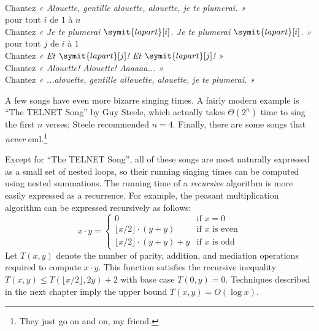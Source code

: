 \begin{pseudocode}
\\
Chantez {\sffamily\itshape « Alouette, gentille alouette, alouette, je te plumerai. »}\\
pour tout $i$ de $1$ à $n$\\
\Indent Chantez {\sffamily\itshape « Je te plumerai} $\symit{lapart}[i]${\sffamily\itshape . Je te plumerai} $\symit{lapart}[i]${\sffamily\itshape . »}\\
\Indent pour tout $j$ de $i$ à $1$ \\
\Indent\Indent Chantez {\sffamily\itshape « Et} $\symit{lapart}[j]${\sffamily\itshape ! Et} $\symit{lapart}[j]${\sffamily\itshape ! »}\\
\Indent Chantez {\sffamily\itshape « Alouette! Alouette! Aaaaaa... »}\\
\Indent Chantez {\sffamily\itshape « ...alouette, gentille allouette, alouette, je te plumerai. »}
\end{pseudocode}

A few songs have even more bizarre singing times. A fairly modern example is “The TELNET Song” by Guy Steele, which actually takes $\Theta(2^n)$ time to sing the first $n$ verses; Steele recommended $n = 4$. Finally, there are some songs that \textit{never} end.\footnote{They just go on and on, my friend.}

Except for “The TELNET Song”, all of these songs are most naturally expressed as a small set of nested loops, so their running singing times can be computed using nested summations. The running time of a \textit{recursive} algorithm is more easily expressed as a recurrence. For example, the peasant multiplication algorithm can be expressed recursively as follows:
\[
x \cdot y = \begin{cases}
0 & \text{if } x = 0\\
\lfloor x/2 \rfloor \cdot (y+y) & \text{if } x \text{ is even}\\
\lfloor x/2 \rfloor \cdot (y+y) + y & \text{if } x \text{ is odd}
\end{cases}
\]
Let $T(x,y)$ denote the number of parity, addition, and mediation operations required to compute $x \cdot y$. This function satisfies the recursive inequality $T(x,y) \le T(\lfloor x/2 \rfloor, 2y) + 2$ with base case $T(0,y) = 0$. Techniques described in the next chapter imply the upper bound $T(x,y) = O(\log x)$.

